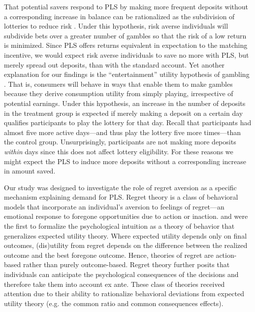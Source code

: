 \documentclass[12pt, titlepage]{article}
\begin{document}
		That potential savers respond to PLS by making more frequent deposits without a corresponding increase in balance can be rationalized as the subdivision of lotteries to reduce risk \parencite{samuelson_risk_1963}. Under this hypothesis, risk averse individuals will subdivide bets over a greater number of gambles so that the risk of a low return is minimized. Since PLS offers returns equivalent in expectation to the matching incentive, we would expect risk averse individuals to save no more with PLS, but merely spread out deposits, than with the standard account. Yet another explanation for our findings is the ``entertainment'' utility hypothesis of gambling \parencite{conlisk_utility_1993}. That is, consumers will behave in ways that enable them to make gambles because they derive consumption utility from simply playing, irrespective of potential earnings. Under this hypothesis, an increase in the number of deposits in the treatment group is expected if merely making a deposit on a certain day qualifies participants to play the lottery for that day. Recall that participants had almost five more active days---and thus play the lottery five more times---than the control group. Unsurprisingly, participants are not making more deposits \emph{within} days since this does not affect lottery eligibility. For these reasons we might expect the PLS to induce more deposits without a corresponding increase in amount saved.

		Our study was designed to investigate the role of regret aversion as a specific mechanism explaining demand for PLS. Regret theory is a class of behavioral models that incorporate an individual's aversion to feelings of regret---an emotional response to foregone opportunities due to action or inaction. \textcite{bell_risk_1983} and \textcite{loomes_regret_1982} were the first to formalize the psychological intuition as a theory of behavior that generalizes expected utility theory. Where expected utility depends only on final outcomes, (dis)utility from regret depends on the difference between the realized outcome and the best foregone outcome. Hence, theories of regret are action-based rather than purely outcome-based. Regret theory further posits that individuals can anticipate the psychological consequences of the decisions and therefore take them into account ex ante. These class of theories received attention due to their ability to rationalize behavioral deviations from expected utility theory (e.g. the common ratio and common consequences effects).
\end{document}
